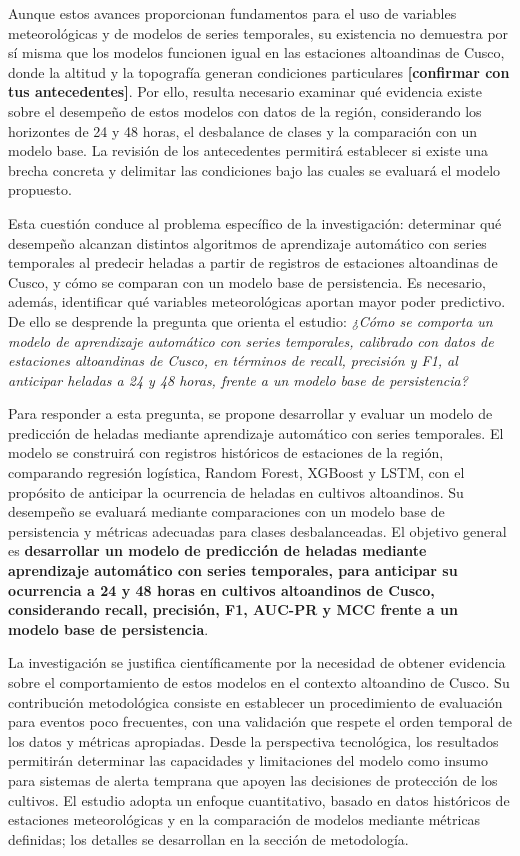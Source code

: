 Aunque estos avances proporcionan fundamentos para el uso de variables meteorológicas y de modelos de series temporales, su existencia no demuestra por sí misma que los modelos funcionen igual en las estaciones altoandinas de Cusco, donde la altitud y la topografía generan condiciones particulares \textbf{[confirmar con tus antecedentes]}. Por ello, resulta necesario examinar qué evidencia existe sobre el desempeño de estos modelos con datos de la región, considerando los horizontes de 24 y 48 horas, el desbalance de clases y la comparación con un modelo base. La revisión de los antecedentes permitirá establecer si existe una brecha concreta y delimitar las condiciones bajo las cuales se evaluará el modelo propuesto.

Esta cuestión conduce al problema específico de la investigación: determinar qué desempeño alcanzan distintos algoritmos de aprendizaje automático con series temporales al predecir heladas a partir de registros de estaciones altoandinas de Cusco, y cómo se comparan con un modelo base de persistencia. Es necesario, además, identificar qué variables meteorológicas aportan mayor poder predictivo. De ello se desprende la pregunta que orienta el estudio: \textit{¿Cómo se comporta un modelo de aprendizaje automático con series temporales, calibrado con datos de estaciones altoandinas de Cusco, en términos de recall, precisión y F1, al anticipar heladas a 24 y 48 horas, frente a un modelo base de persistencia?}

Para responder a esta pregunta, se propone desarrollar y evaluar un modelo de predicción de heladas mediante aprendizaje automático con series temporales. El modelo se construirá con registros históricos de estaciones de la región, comparando regresión logística, Random Forest, XGBoost y LSTM, con el propósito de anticipar la ocurrencia de heladas en cultivos altoandinos. Su desempeño se evaluará mediante comparaciones con un modelo base de persistencia y métricas adecuadas para clases desbalanceadas. El objetivo general es \textbf{desarrollar un modelo de predicción de heladas mediante aprendizaje automático con series temporales, para anticipar su ocurrencia a 24 y 48 horas en cultivos altoandinos de Cusco, considerando recall, precisión, F1, AUC-PR y MCC frente a un modelo base de persistencia}.

La investigación se justifica científicamente por la necesidad de obtener evidencia sobre el comportamiento de estos modelos en el contexto altoandino de Cusco. Su contribución metodológica consiste en establecer un procedimiento de evaluación para eventos poco frecuentes, con una validación que respete el orden temporal de los datos y métricas apropiadas. Desde la perspectiva tecnológica, los resultados permitirán determinar las capacidades y limitaciones del modelo como insumo para sistemas de alerta temprana que apoyen las decisiones de protección de los cultivos. El estudio adopta un enfoque cuantitativo, basado en datos históricos de estaciones meteorológicas y en la comparación de modelos mediante métricas definidas; los detalles se desarrollan en la sección de metodología.

